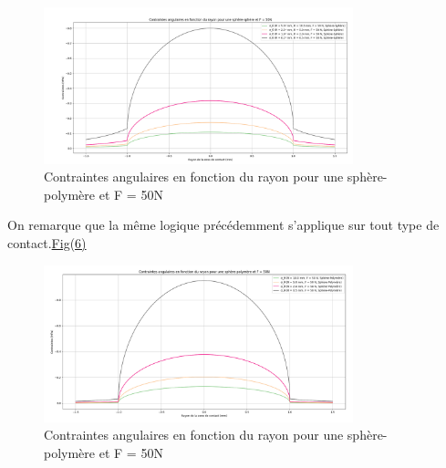 \documentclass[a4paper,12pt]{article}
\begin{document}
\begin{figure}[H] %
	\centering
	\includegraphics[width=0.8\textwidth]{ang1.png} %
	\caption{Contraintes angulaires en fonction du rayon pour une sphère-polymère et F = 50N} %
	\label{fig:mon_image5} %
\end{figure}
On remarque que la même logique précédemment s'applique sur tout type de contact.\hyperref[fig:mon_image6]{Fig(6)}
\begin{figure}[H] %
	\centering
	\includegraphics[width=0.8\textwidth]{ang2.png} %
	\caption{Contraintes angulaires en fonction du rayon pour une sphère-polymère et F = 50N} %
	\label{fig:mon_image6} %
\end{figure}
\clearpage
\end{document}
